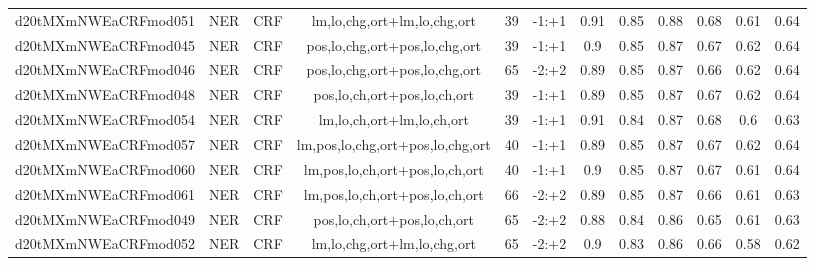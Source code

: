 \documentclass[a4paper]{article}
\begin{document}
\begin{landscape}
\begin{center}
\begin{tabular}{ |c|c|c|c|c|c|c|c|c|c|c|c|}
 	
 	\small{ d20tMXmNWEaCRFmod051 } & NER & CRF & lm,lo,chg,ort+lm,lo,chg,ort  &  39 &  -1:+1  &  0.91 & 0.85 & 0.88  &  0.68 & 0.61 & 0.64 \\
 	

 
 	
 	\small{ d20tMXmNWEaCRFmod045 } & NER & CRF & pos,lo,chg,ort+pos,lo,chg,ort  &  39 &  -1:+1  &  0.9 & 0.85 & 0.87  &  0.67 & 0.62 & 0.64 \\
 	

 
 	
 	\small{ d20tMXmNWEaCRFmod046 } & NER & CRF & pos,lo,chg,ort+pos,lo,chg,ort  &  65 &  -2:+2  &  0.89 & 0.85 & 0.87  &  0.66 & 0.62 & 0.64 \\
 	

 
 	
 	\small{ d20tMXmNWEaCRFmod048 } & NER & CRF & pos,lo,ch,ort+pos,lo,ch,ort  &  39 &  -1:+1  &  0.89 & 0.85 & 0.87  &  0.67 & 0.62 & 0.64 \\
 	

 
 	
 	\small{ d20tMXmNWEaCRFmod054 } & NER & CRF & lm,lo,ch,ort+lm,lo,ch,ort  &  39 &  -1:+1  &  0.91 & 0.84 & 0.87  &  0.68 & 0.6 & 0.63 \\
 	

 
 	
 	\small{ d20tMXmNWEaCRFmod057 } & NER & CRF & lm,pos,lo,chg,ort+pos,lo,chg,ort  &  40 &  -1:+1  &  0.89 & 0.85 & 0.87  &  0.67 & 0.62 & 0.64 \\
 	

 
 	
 	\small{ d20tMXmNWEaCRFmod060 } & NER & CRF & lm,pos,lo,ch,ort+pos,lo,ch,ort  &  40 &  -1:+1  &  0.9 & 0.85 & 0.87  &  0.67 & 0.61 & 0.64 \\
 	

 
 	
 	\small{ d20tMXmNWEaCRFmod061 } & NER & CRF & lm,pos,lo,ch,ort+pos,lo,ch,ort  &  66 &  -2:+2  &  0.89 & 0.85 & 0.87  &  0.66 & 0.61 & 0.63 \\
 	

 
 	
 	\small{ d20tMXmNWEaCRFmod049 } & NER & CRF & pos,lo,ch,ort+pos,lo,ch,ort  &  65 &  -2:+2  &  0.88 & 0.84 & 0.86  &  0.65 & 0.61 & 0.63 \\
 	

 
 	
 	\small{ d20tMXmNWEaCRFmod052 } & NER & CRF & lm,lo,chg,ort+lm,lo,chg,ort  &  65 &  -2:+2  &  0.9 & 0.83 & 0.86  &  0.66 & 0.58 & 0.62 \\
 	


\end{tabular}
\end{center}
\end{landscape}
\end{document}

